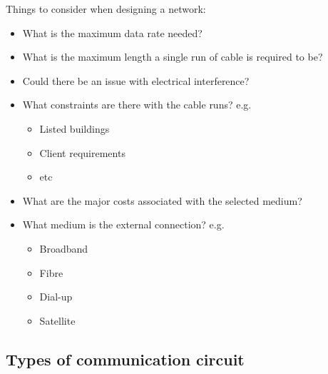 
Things to consider when designing a network:
\begin{itemize}
  \item What is the maximum data rate needed?
  \item What is the maximum length a single run of cable is required to be?
  \item Could there be an issue with electrical interference?
  \item What constraints are there with the cable runs? e.g.
  \begin{itemize}
    \item Listed buildings
    \item Client requirements
    \item etc
  \end{itemize}
  \item What are the major costs associated with the selected medium?
  \item What medium is the external connection? e.g.
  \begin{itemize}
    \item Broadband
    \item Fibre
    \item Dial-up
    \item Satellite
  \end{itemize}
\end{itemize}

\subsection*{Types of communication circuit}

